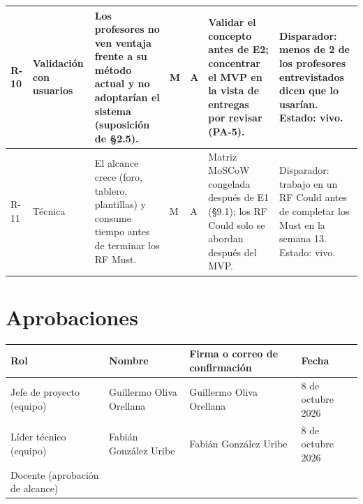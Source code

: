 \documentclass[10pt,a4paper]{article}
\newcommand{\hrow}{\rowcolor{encabezado}}
\newcommand{\h}[1]{\textbf{#1}}
\begin{document}
\begin{xltabular}{\linewidth}{|P{0.8cm}|P{1.9cm}|L|P{0.9cm}|P{1.1cm}|P{3.4cm}|P{3.0cm}|}
R-10 & Validación con usuarios & Los profesores no ven ventaja frente a su método actual y no adoptarían el sistema (suposición de §2.5). & M & A & Validar el concepto antes de E2; concentrar el MVP en la vista de entregas por revisar (PA-5). & Disparador: menos de 2 de los profesores entrevistados dicen que lo usarían. Estado: vivo. \\ \hline
R-11 & Técnica & El alcance crece (foro, tablero, plantillas) y consume tiempo antes de terminar los RF Must. & M & A & Matriz MoSCoW congelada después de E1 (§9.1); los RF Could solo se abordan después del MVP. & Disparador: trabajo en un RF Could antes de completar los Must en la semana 13. Estado: vivo. \\ \hline
\end{xltabular}

\section{Aprobaciones}
\begin{xltabular}{\linewidth}{|P{4.6cm}|L|P{3.4cm}|P{2.4cm}|}
\hline\hrow \h{Rol} & \h{Nombre} & \h{Firma o correo de confirmación} & \h{Fecha} \\ \hline
\endhead
Jefe de proyecto (equipo) & Guillermo Oliva Orellana & Guillermo Oliva Orellana & 8 de octubre 2026 \\ \hline
Líder técnico (equipo) & Fabián González Uribe & Fabián González Uribe & 8 de octubre 2026 \\ \hline
Docente (aprobación de alcance) & & & \\ \hline
\end{xltabular}

\clearpage
\end{document}
